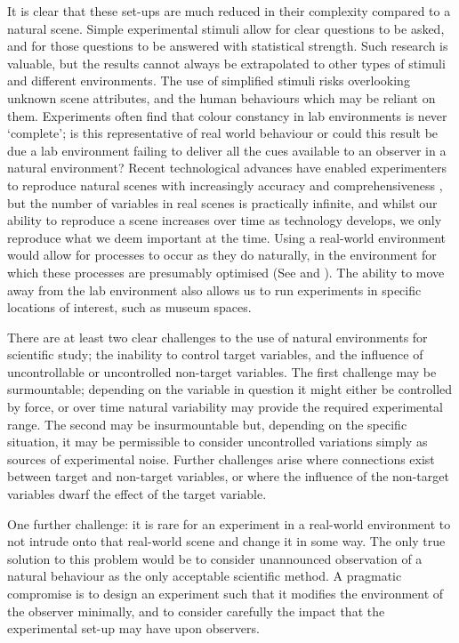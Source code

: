 It is clear that these set-ups are much reduced in their complexity compared to a natural scene. Simple experimental stimuli allow for clear questions to be asked, and for those questions to be answered with statistical strength. Such research is valuable, but the results cannot always be extrapolated to other types of stimuli and different environments. The use of simplified stimuli risks overlooking unknown scene attributes, and the human behaviours which may be reliant on them. %
Experiments often find that colour constancy in lab environments is never `complete'; is this representative of real world behaviour or could this result be due a lab environment failing to deliver all the cues available to an observer in a natural environment? Recent technological advances have enabled experimenters to reproduce natural scenes with increasingly accuracy and comprehensiveness \citep{heasly_rendertoolbox3_2014}, but the number of variables in real scenes is practically infinite, and whilst our ability to reproduce a scene increases over time as technology develops, we only reproduce what we deem important at the time. Using a real-world environment would allow for processes to occur as they do naturally, in the environment for which these processes are presumably optimised (See \citet{kelly_chips_2018} and \citet{shepard_perceptual_1992}). The ability to move away from the lab environment also allows us to run experiments in specific locations of interest, such as museum spaces.

There are at least two clear challenges to the use of natural environments for scientific study; the inability to control target variables, and the influence of uncontrollable or uncontrolled non-target variables. The first challenge may be surmountable; depending on the variable in question it might either be controlled by force, or over time natural variability may provide the required experimental range. The second may be insurmountable but, depending on the specific situation, it may be permissible to consider uncontrolled variations simply as sources of experimental noise. Further challenges arise where connections exist between target and non-target variables, or where the influence of the non-target variables dwarf the effect of the target variable.

One further challenge: it is rare for an experiment in a real-world environment to not intrude onto that real-world scene and change it in some way. The only true solution to this problem would be to consider unannounced observation of a natural behaviour as the only acceptable scientific method. A pragmatic compromise is to design an experiment such that it modifies the environment of the observer minimally, and to consider carefully the impact that the experimental set-up may have upon observers.

